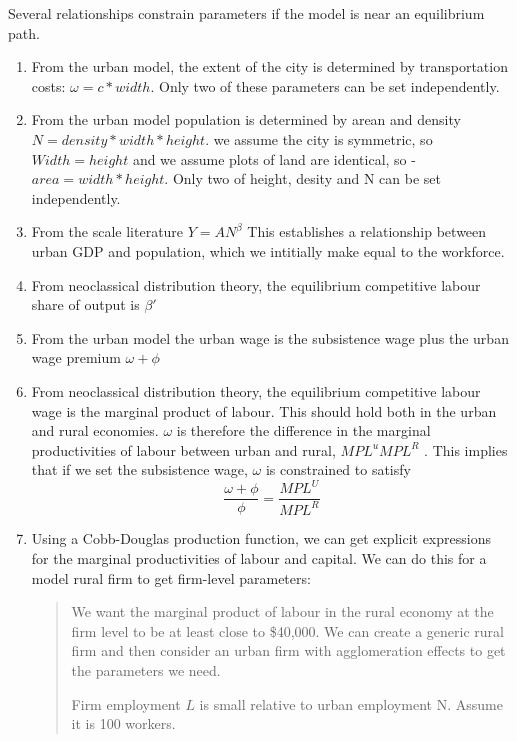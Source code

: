 Several relationships constrain parameters if the model is near an equilibrium path. 
\begin{enumerate}
    \item From the urban model, the extent of the city is determined by transportation costs:   $\omega =c*width$.  Only two of these parameters can be set independently.

    \item From the urban model population is determined by arean and density   $N=density* width*height$. we assume the city is symmetric, so $Width=height$ and we assume plots  of land are identical, so  - $area=width*height$. Only two of height, desity and N can be set independently.  

    \item From the scale literature $Y=AN^\beta$ This establishes a relationship between urban GDP and population, which we intitially make equal to the workforce. 

    \item From neoclassical distribution theory, the equilibrium competitive labour share of output is $\beta'$
    
    \item From the urban model the urban wage is the subsistence wage plus the urban wage premium $\omega+\phi$ 

    \item From neoclassical distribution theory, the equilibrium competitive labour wage is the marginal product of labour. This should hold both in the urban and rural economies. $\omega$ is therefore the difference in the marginal productivities of labour between urban and rural, ${MPL^uMPL^R}$ .  This implies that if we set the subsistence wage, $\omega$ is constrained to satisfy \[\frac{\omega+\phi}{\phi}= \frac{MPL^U}{MPL^R}\] 
    
    \item Using a Cobb-Douglas production function, we can get explicit expressions for the marginal productivities of labour and capital. We can do this for a model rural firm to get firm-level parameters:
    \begin{quotation} \color{orange}
        We want the marginal product of labour in the rural economy at the firm level to be at least close to \$40,000.  We can create a generic rural firm and then consider an urban firm with agglomeration effects to get the parameters we need. 

Firm employment $L$ is small relative to  urban employment {N}. Assume it is 100 workers. 


\end{quotation}
\end{enumerate}
